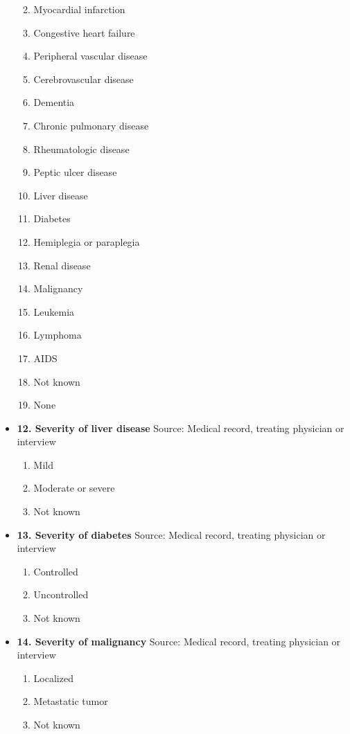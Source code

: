 \documentclass[
]{scrartcl}
\providecommand{\tightlist}{%
  \setlength{\itemsep}{0pt}\setlength{\parskip}{0pt}}\usepackage{longtable,booktabs,array}
\begin{document}
\begin{itemize}
  \begin{enumerate}
  \def\labelenumi{\arabic{enumi}.}
  \tightlist
  \item
    Myocardial infarction
  \item
    Congestive heart failure
  \item
    Peripheral vascular disease
  \item
    Cerebrovascular disease
  \item
    Dementia
  \item
    Chronic pulmonary disease
  \item
    Rheumatologic disease
  \item
    Peptic ulcer disease
  \item
    Liver disease
  \item
    Diabetes
  \item
    Hemiplegia or paraplegia
  \item
    Renal disease
  \item
    Malignancy
  \item
    Leukemia
  \item
    Lymphoma
  \item
    AIDS
  \item
    Not known
  \item
    None
  \end{enumerate}
\item
  \textbf{12. Severity of liver disease} Source: Medical record,
  treating physician or interview

  \begin{enumerate}
  \def\labelenumi{\arabic{enumi}.}
  \tightlist
  \item
    Mild
  \item
    Moderate or severe
  \item
    Not known
  \end{enumerate}
\item
  \textbf{13. Severity of diabetes} Source: Medical record, treating
  physician or interview

  \begin{enumerate}
  \def\labelenumi{\arabic{enumi}.}
  \tightlist
  \item
    Controlled
  \item
    Uncontrolled
  \item
    Not known
  \end{enumerate}
\item
  \textbf{14. Severity of malignancy} Source: Medical record, treating
  physician or interview

  \begin{enumerate}
  \def\labelenumi{\arabic{enumi}.}
  \tightlist
  \item
    Localized
  \item
    Metastatic tumor
  \item
    Not known
  \end{enumerate}
\end{itemize}
\end{document}
